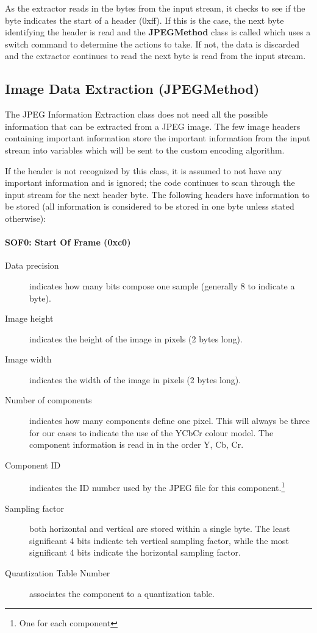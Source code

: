 As the extractor reads in the bytes from the input stream, it checks to see if the byte indicates the start of a header (0xff). 
If this is the case, the next byte identifying the header is read and the \textbf{JPEGMethod} class is 
called which uses a switch command to determine the actions to take. 
If not, the data is discarded and the extractor continues to read the next byte is read from the input stream. 

\subsection{Image Data Extraction (JPEGMethod)}

The JPEG Information Extraction class does not need all the possible information that can be extracted from a JPEG image. 
The few image headers containing important information store the important information from the input stream into 
variables which will be sent to the custom encoding algorithm. 

If the header is not recognized by this class, 
it is assumed to not have any important information and is ignored; 
the code continues to scan through the input stream for the next header byte. 
The following headers have  information to be stored (all information is considered to be stored in one byte unless stated otherwise):

\paragraph*{SOF0: Start Of Frame (0xc0)}
\begin{description}
	\item[Data precision] indicates how many bits compose one sample (generally 8 to indicate a byte).
	\item[Image height] indicates the height of the image in pixels (2 bytes long).
	\item[Image width] indicates the width of the image in pixels (2 bytes long).
	\item[Number of components] indicates how many components define one pixel. 
		This will always be three for our cases to indicate the use of the YCbCr colour model. 
		The component information is read in in the order Y, Cb, Cr.
	\item[Component ID] indicates the ID number used by the JPEG file for this component.\footnote{One for each component}
	\item[Sampling factor] both horizontal and vertical are stored within a single byte. 
		The least significant 4 bits indicate teh vertical sampling factor, 
		while the most significant 4 bits indicate the horizontal sampling factor.\footnotemark[1] 
	\item[Quantization Table Number] associates the component to a quantization table.\footnotemark[1] 
\end{description}

